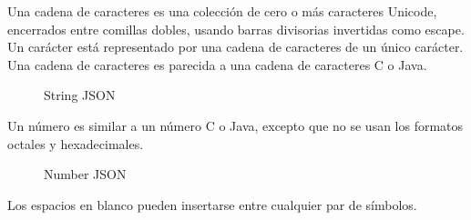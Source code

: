 Una cadena de caracteres es una colecci\'on de cero o m\'as caracteres Unicode, encerrados entre comillas dobles, usando barras divisorias invertidas como escape. Un car\'acter est\'a representado por una cadena de caracteres de un \'unico car\'acter. Una cadena de caracteres es parecida a una cadena de caracteres C o Java.

\begin{figure}[htbp]
\centering
{}
\caption{String JSON} \label{fig:stringJSON}
\end{figure}

Un n\'umero es similar a un n\'umero C o Java, excepto que no se usan los formatos octales y hexadecimales.

\begin{figure}[htbp]
\centering
{}
\caption{Number JSON} \label{fig:numberJSON}
\end{figure}

Los espacios en blanco pueden insertarse entre cualquier par de s\'imbolos.

